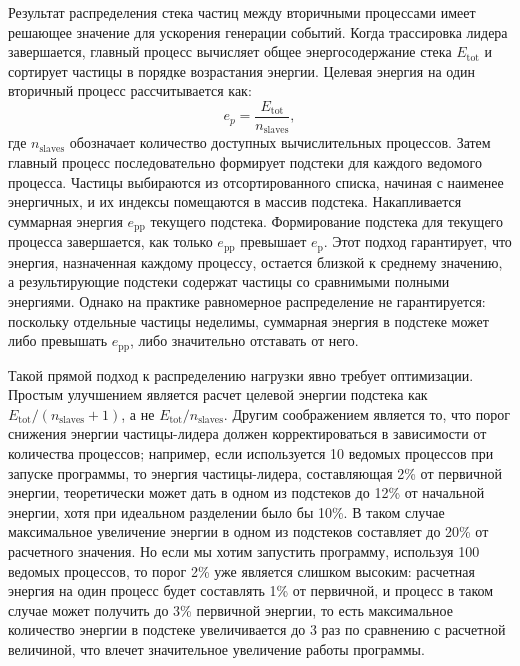 \documentclass[aps,preprint,showpacs,aps,amsmath,showkeys,nobibnotes,nofootinbib,footnotes,superscriptaddress]{revtex4-2}
\begin{document}
Результат распределения стека частиц между вторичными процессами имеет решающее значение для ускорения генерации событий. Когда трассировка лидера завершается, главный процесс вычисляет общее энергосодержание стека $E_{\text{tot}}$ и сортирует частицы в порядке возрастания энергии. Целевая энергия на один вторичный процесс рассчитывается как:
\[
e_p = \frac{E_{\text{tot}}}{n_{\text{slaves}}},
\]
где $n_{\text{slaves}}$ обозначает количество доступных вычислительных процессов.
Затем главный процесс последовательно формирует подстеки для каждого ведомого процесса. Частицы выбираются из отсортированного списка, начиная с наименее энергичных, и их индексы помещаются в массив подстека. Накапливается суммарная энергия $e_{\text{pp}}$ текущего подстека. Формирование подстека для текущего процесса завершается, как только $e_{\text{pp}}$ превышает $e_{\text{p}}$. Этот подход гарантирует, что энергия, назначенная каждому процессу, остается близкой к среднему значению, а результирующие подстеки содержат частицы со сравнимыми полными энергиями.
Однако на практике равномерное распределение не гарантируется: поскольку отдельные частицы неделимы, суммарная энергия в подстеке может либо превышать $e_{\text{pp}}$, либо значительно отставать от него. %

Такой прямой подход к распределению нагрузки явно требует оптимизации. Простым улучшением является расчет целевой энергии подстека как $E_{\text{tot}}/(n_{\text{slaves}} + 1)$, а не ${E_{\text{tot}}}/{n_{\text{slaves}}}$. Другим соображением является то, что порог снижения энергии частицы-лидера должен корректироваться в зависимости от количества процессов; например, если используется 10 ведомых процессов при запуске программы, то энергия частицы-лидера, составляющая 2\% от первичной энергии, теоретически может дать в одном из подстеков до 12\% от начальной энергии, хотя при идеальном разделении было бы 10\%. В таком случае максимальное увеличение энергии в одном из подстеков составляет до 20\% от расчетного значения. Но если мы хотим запустить программу, используя 100 ведомых процессов, то порог 2\% уже является слишком высоким: расчетная энергия на один процесс будет составлять 1\% от первичной, и процесс в таком случае может получить до 3\% первичной энергии, то есть максимальное количество энергии в подстеке увеличивается до 3 раз по сравнению с расчетной величиной, что влечет значительное увеличение работы программы. 
\end{document}
